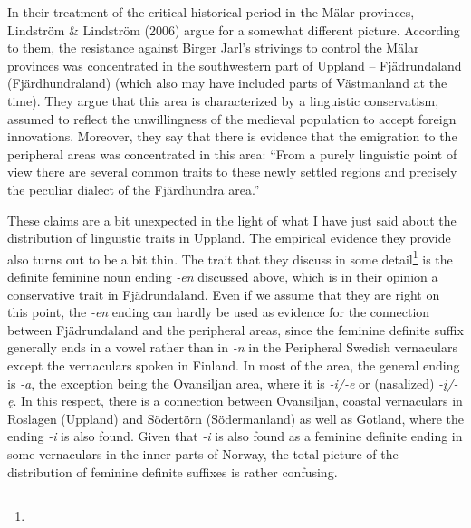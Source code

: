 \begin{styleBodytextC}
In their treatment of the critical historical period in the Mälar provinces, Lindström \& Lindström (2006) argue for a somewhat different picture. According to them, the resistance against Birger Jarl’s strivings to control the Mälar provinces was concentrated in the southwestern part of Uppland – Fjädrundaland (Fjärdhundraland) (which also may have included parts of Västmanland at the time). They argue that this area is characterized by a linguistic conservatism, assumed to reflect the unwillingness of the medieval population to accept foreign innovations. Moreover, they say that there is evidence that the emigration to the peripheral areas was concentrated in this area: “From a purely linguistic point of view there are several common traits to these newly settled regions and precisely the peculiar dialect of the Fjärdhundra area.”

\end{styleBodytextC}

\begin{styleBodytextC}
These claims are a bit unexpected in the light of what I have just said about the distribution of linguistic traits in Uppland. The empirical evidence they provide also turns out to be a bit thin. The trait that they discuss in some detail\footnote{} is the definite feminine noun ending \textit{{}-en} discussed above, which is in their opinion a conservative trait in Fjädrundaland. Even if we assume that they are right on this point, the\textit{ -}\textit{en} ending can hardly be used as evidence for the connection between Fjädrundaland and the peripheral areas, since the feminine definite suffix generally ends in a vowel rather than in\textit{ -}\textit{n} in the Peripheral Swedish vernaculars except the vernaculars spoken in Finland.  In most of the area, the general ending is\textit{ -a}, the exception being the Ovansiljan area, where it is\textit{ -}\textit{i/-e }or (nasalized)\textit{ -}\textit{\k{i}/-ę}. In this respect, there is a connection between Ovansiljan, coastal vernaculars in Roslagen (Uppland) and Södertörn (Södermanland) as well as Gotland, where the ending\textit{ -}\textit{i} is also found. Given that\textit{ -}\textit{i} is also found as a feminine definite ending in some vernaculars in the inner parts of Norway, the total picture of the distribution of feminine definite suffixes is rather confusing. 

\end{styleBodytextC}

